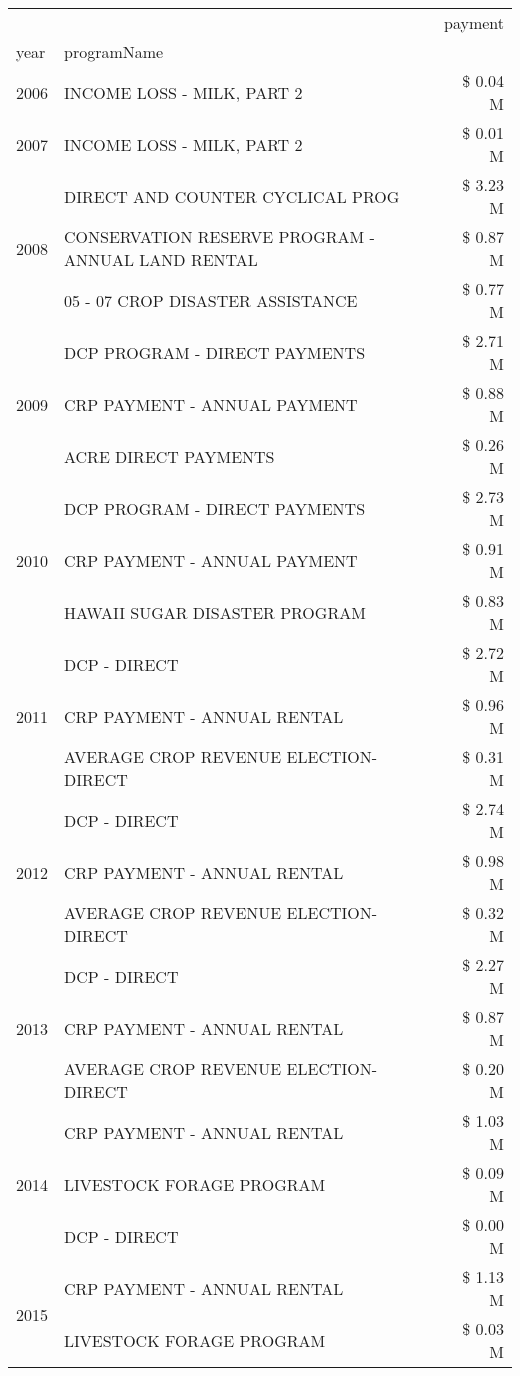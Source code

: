 \begin{tabular}{llr}
\toprule
 &  & payment \\
year & programName &  \\
\midrule
2006 & INCOME LOSS - MILK, PART 2 & \$ 0.04 M \\
\cline{1-3}
2007 & INCOME LOSS - MILK, PART 2 & \$ 0.01 M \\
\cline{1-3}
\multirow[t]{3}{*}{2008} & DIRECT AND COUNTER CYCLICAL PROG & \$ 3.23 M \\
 & CONSERVATION RESERVE PROGRAM - ANNUAL LAND RENTAL & \$ 0.87 M \\
 & 05 - 07 CROP DISASTER ASSISTANCE & \$ 0.77 M \\
\cline{1-3}
\multirow[t]{3}{*}{2009} & DCP PROGRAM - DIRECT PAYMENTS & \$ 2.71 M \\
 & CRP PAYMENT - ANNUAL PAYMENT & \$ 0.88 M \\
 & ACRE DIRECT PAYMENTS & \$ 0.26 M \\
\cline{1-3}
\multirow[t]{3}{*}{2010} & DCP PROGRAM - DIRECT PAYMENTS & \$ 2.73 M \\
 & CRP PAYMENT - ANNUAL PAYMENT & \$ 0.91 M \\
 & HAWAII SUGAR DISASTER PROGRAM & \$ 0.83 M \\
\cline{1-3}
\multirow[t]{3}{*}{2011} & DCP - DIRECT & \$ 2.72 M \\
 & CRP PAYMENT - ANNUAL RENTAL & \$ 0.96 M \\
 & AVERAGE CROP REVENUE ELECTION-DIRECT & \$ 0.31 M \\
\cline{1-3}
\multirow[t]{3}{*}{2012} & DCP - DIRECT & \$ 2.74 M \\
 & CRP PAYMENT - ANNUAL RENTAL & \$ 0.98 M \\
 & AVERAGE CROP REVENUE ELECTION-DIRECT & \$ 0.32 M \\
\cline{1-3}
\multirow[t]{3}{*}{2013} & DCP - DIRECT & \$ 2.27 M \\
 & CRP PAYMENT - ANNUAL RENTAL & \$ 0.87 M \\
 & AVERAGE CROP REVENUE ELECTION-DIRECT & \$ 0.20 M \\
\cline{1-3}
\multirow[t]{3}{*}{2014} & CRP PAYMENT - ANNUAL RENTAL & \$ 1.03 M \\
 & LIVESTOCK FORAGE PROGRAM & \$ 0.09 M \\
 & DCP - DIRECT & \$ 0.00 M \\
\cline{1-3}
\multirow[t]{3}{*}{2015} & CRP PAYMENT - ANNUAL RENTAL & \$ 1.13 M \\
 & LIVESTOCK FORAGE PROGRAM & \$ 0.03 M \\

\end{tabular}

